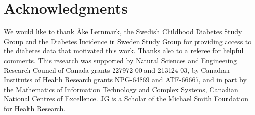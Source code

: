 \documentclass[article, shortnames]{jss}
\begin{document}
\section*{Acknowledgments}

We would like to thank {\AA}ke Lernmark,
the Swedish Childhood Diabetes Study Group and the
Diabetes Incidence in Sweden Study Group for
providing access to the diabetes data that motivated this work.
Thanks also to a referee for helpful comments.
This research was supported
by Natural Sciences and Engineering Research Council of Canada grants
227972-00 and 213124-03,
by Canadian Institutes of Health Research grants
NPG-64869 and ATF-66667, and in part by
the Mathematics of Information Technology and Complex Systems,
Canadian National Centres of Excellence.
JG is a Scholar of the Michael Smith Foundation for Health Research.


\end{document}
